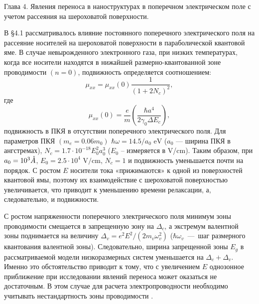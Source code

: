 Глава 4. Явления переноса в наноструктурах в поперечном электрическом поле с учетом рассеяния на шероховатой поверхности.

В §4.1 рассматривалось влияние постоянного поперечного электрического поля на рассеяние носителей на шероховатой поверхности в параболической квантовой яме. В случае невырожденного электронного газа, при низких температурах, когда все носители находятся в нижайшей размерно-квантованной зоне проводимости $(n=0)$, подвижность определяется соотношением:
\begin{equation} \label{eq:syn_23}
\mu_{xx} =\mu_{xx}(0)\frac{1}{\left(1+2 N_c \right)^2 } ,
\end{equation}
где
\[
\mu_{xx}(0)=\frac{e}{m} \left(\frac{\hbar a^4 }{2\gamma_0 \Delta E_c } \right),
\]
подвижность в ПКЯ в отсутствии поперечного электрического поля.
Для параметров ПКЯ $(m_e = 0.06 m_0 )$ $\hbar \omega = 14.5/a_0 \text{ eV}$ ($a_0 $ --- ширина ПКЯ в ангстремах), $N_c =1.7\cdot 10^{-18} E_0^2 a_0^3 $ ($E_0 $ -- измеряется в V/cm). Таким образом, при $a_0 = 10^3 \AA$, $E_0 = 2.5\cdot 10^4 \text{ V/cm}$, $N_c =1$ и подвижность уменьшается почти на порядок. С ростом $E$ носители тока «прижимаются» к одной из поверхностей квантовой ямы, поэтому их взаимодействие с шероховатой поверхностью увеличивается, что приводит к уменьшению времени релаксации, а, следовательно, и подвижности.

С ростом напряженности поперечного электрического поля минимум зоны проводимости смещается в запрещенную зону на $\Delta_c $, а экстремум валентной зоны поднимается на величину $\Delta_v =e^2 E^2  / (2m_v  \omega_v^2 )$ ($\hbar \omega_v $~---~шаг размерного квантования валентной зоны). Следовательно, ширина запрещенной зоны $E_g$ в рассматриваемой модели низкоразмерных систем уменьшается на $\Delta_c +\Delta_v $. Именно это обстоятельство приводит к тому, что с увеличением $E$ однозонное приближение при исследовании явлений переноса может оказаться не достаточным. В этом случае для расчета электропроводности необходимо учитывать нестандартность зоны проводимости \cite{Lax1960,Cohen1961}.

